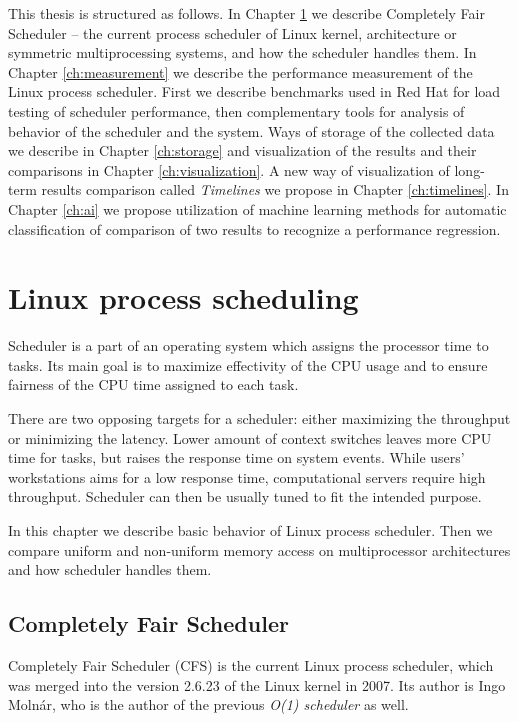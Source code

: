 This thesis is structured as follows. In Chapter \ref{ch:scheduler} we describe
Completely Fair Scheduler -- the current process scheduler of Linux kernel,
architecture or symmetric multiprocessing systems, and how the scheduler handles
them. In Chapter \ref{ch:measurement} we describe the performance measurement of
the Linux process scheduler. First we describe benchmarks used in Red Hat for
load testing of scheduler performance, then complementary tools for analysis of
behavior of the scheduler and the system. Ways of storage of the collected data
we describe in Chapter \ref{ch:storage} and visualization of the results and
their comparisons in Chapter \ref{ch:visualization}. A new way of visualization
of long-term results comparison called \emph{Timelines} we propose in Chapter
\ref{ch:timelines}. In Chapter \ref{ch:ai} we propose utilization of machine
learning methods for automatic classification of comparison of two results to
recognize a performance regression.



\chapter{Linux process scheduling} \label{ch:scheduler}
Scheduler is a part of an operating system which assigns the processor time to tasks.
Its main goal is to maximize effectivity of the CPU usage and to ensure fairness of the
CPU time assigned to each task.

There are two opposing targets for a scheduler: either maximizing the throughput or
minimizing the latency. Lower amount of context switches leaves more CPU time for
tasks, but raises the response time on system events.
While users' workstations aims for a low response time, computational servers
require high throughput. Scheduler can then be usually tuned to fit the intended
purpose.

In this chapter we describe basic behavior of Linux process scheduler. Then we
compare uniform and non-uniform memory access on multiprocessor architectures
and how scheduler handles them.

\section{Completely Fair Scheduler}
Completely Fair Scheduler (CFS) is the current Linux process scheduler, which was
merged into the version 2.6.23 of the Linux kernel in 2007. Its author is Ingo
Molnár, who is the author of the previous \emph{O(1) scheduler} as well.

